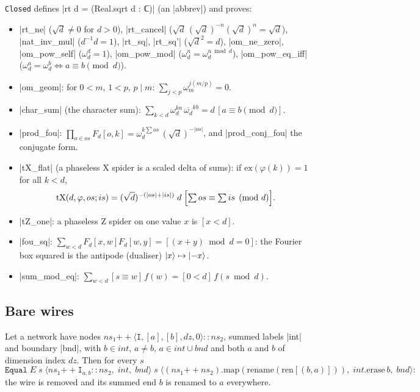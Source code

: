 \texttt{Closed} defines \lean|rt d = (Real.sqrt d : ℂ)| (an \lean|abbrev|) and proves:
\begin{itemize}
\item \lean|rt_ne| ($\sqrt d\ne0$ for $d>0$), \lean|rt_cancel|
  ($\sqrt d\,(\sqrt d)^{-n}(\sqrt d)^n=\sqrt d$), \lean|nat_inv_mul| ($d^{-1}d=1$), \lean|rt_sq|,
  \lean|rt_sq'| ($\sqrt d^2=d$), \lean|om_ne_zero|, \lean|om_pow_self| ($\omega_d^d=1$),
  \lean|om_pow_mod| ($\omega_d^n=\omega_d^{n\bmod d}$), \lean|om_pow_eq_iff|
  ($\omega_d^a=\omega_d^b\iff a\equiv b\pmod d$).
\item \lean|om_geom|: for $0<m$, $1<p$, $p\mid m$: $\sum_{j<p}\omega_m^{j(m/p)}=0$.
\item \lean|char_sum| (the character sum): $\sum_{k<d}\omega_d^{ka}\,\overline{\omega_d}^{kb}=d\,[a\equiv
  b\pmod d]$.
\item \lean|prod_fou|: $\prod_{o\in os}F_d[o,k]=\omega_d^{k\sum os}\,(\sqrt d)^{-|os|}$, and
  \lean|prod_conj_fou| the conjugate form.
\item \lean|tX_flat| (a phaseless X spider is a scaled delta of sums): if
  $\mathrm{ex}(\varphi(k))=1$ for all $k<d$,
  \[\mathrm{tX}(d,\varphi,os;is)=(\sqrt d)^{-(|os|+|is|)}\;d\;\Bigl[\textstyle\sum os\equiv\sum is\pmod d\Bigr].\]
\item \lean|tZ_one|: a phaseless Z spider on one value $x$ is $[x<d]$.
\item \lean|fou_sq|: $\sum_{w<d}F_d[x,w]F_d[w,y]=[(x+y)\bmod d=0]$: the Fourier box squared is the
  antipode (dualiser) $\lvert x \rangle\mapsto\lvert -x \rangle$.
\item \lean|sum_mod_eq|: $\sum_{w<d}[s\equiv w]\,f(w)=[0<d]\,f(s\bmod d)$.
\end{itemize}

\subsection{Bare wires}

\begin{theorem}\label{thm:lean-core-wireelim}
Let a network have nodes $ns_1\mathbin{+\!\!+}\langle\mathtt{I},[a],[b],dz,0\rangle{::}ns_2$, summed
labels \lean|int| and boundary \lean|bnd|, with $b\in\mathit{int}$, $a\ne b$, $a\in\mathit{int}\cup\mathit{bnd}$
and both $a$ and $b$ of dimension index $dz$. Then for every $s$
\[
  \mathtt{Equal}\;E\;s\;\langle ns_1\mathbin{+\!\!+}\mathtt{I}_{a,b}{::}ns_2,\;\mathit{int},\;\mathit{bnd}\rangle
  \;s\;\langle(ns_1\mathbin{+\!\!+}ns_2).\mathrm{map}(\mathrm{rename}(\mathrm{ren}[(b,a)])),\;
  \mathit{int}.\mathrm{erase}\,b,\;\mathit{bnd}\rangle:
\]
the wire is removed and its summed end $b$ is renamed to $a$ everywhere.
\end{theorem}

